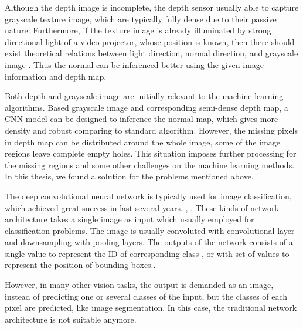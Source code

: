 Although the depth image is incomplete, the depth sensor usually able to capture grayscale texture image, which are typically fully dense due to their passive nature. Furthermore, if the texture image is already illuminated by strong directional light of a video projector, whose position is known, then there should exist theoretical relations between light direction, normal direction, and grayscale image . Thus the normal can be inferenced better using the given image information and depth map. 

Both depth and grayscale image are initially relevant to the machine learning algorithms. Based grayscale image and corresponding semi-dense depth map, a CNN model can be designed to inference the normal map, which gives more density and robust comparing to standard algorithm. However, the missing pixels in depth map can be distributed around the whole image, some of the image regions leave complete empty holes. This situation imposes further processing for the missing regions and some other challenges on the machine learning methods. 
In this thesis, we found a solution for the problems mentioned above.

The deep convolutional neural network is typically used for image classification, which achieved great success in last several years. \cite{yolov3}, \cite{efficientDet}. 
These kinds of network architecture takes a single image as input which usually employed for classification problems. The image is usually convoluted with convolutional layer and downsampling with pooling layers. The outputs of the network consists of a single value to represent the ID of corresponding class \cite{efficientDet}, or with set of values to represent the position of bounding boxes.\cite{yolov3}.


However, in many other vision tasks, the output is demanded as an image, instead of predicting one or several classes of the input, but the classes of each pixel are predicted, like image segmentation\cite{unet}. In this case, the traditional network architecture is not suitable anymore.

